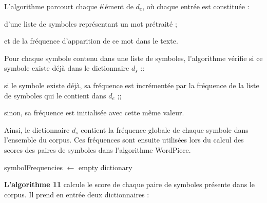 \documentclass[12pt,a4paper]{report}
\begin{document}
	L’algorithme parcourt chaque élément de $d_e$, où chaque entrée est constituée :
	
	\begin{itemizeFB}
		\item d’une liste de symboles représentant un mot prétraité ;
		\item et de la fréquence d’apparition de ce mot dans le texte.
	\end{itemizeFB}
	
	Pour chaque symbole contenu dans une liste de symboles, l’algorithme vérifie si ce symbole existe déjà dans le dictionnaire $d_s$ ::
	
	\begin{itemizeFB}
		\item si le symbole existe déjà, sa fréquence est incrémentée par la fréquence de la liste de symboles qui le contient dans $d_e$ ;;
		\item sinon, sa fréquence est initialisée avec cette même valeur.
	\end{itemizeFB}
	
	Ainsi, le dictionnaire $d_s$ contient la fréquence globale de chaque symbole dans l’ensemble du corpus. Ces fréquences sont ensuite utilisées lors du calcul des scores des paires de symboles dans l’algorithme WordPiece.
	
	\begin{algorithm}[H]
		\caption{ComputeSymbolFrequencies}
		
		
		symbolFrequencies $\leftarrow$ empty dictionary\;
		
		
	\end{algorithm}
	
	\vspace{0.5cm}
	
	\textbf{L’algorithme 11} calcule le score de chaque paire de symboles présente dans le corpus. Il prend en entrée deux dictionnaires :
	
\end{document}

